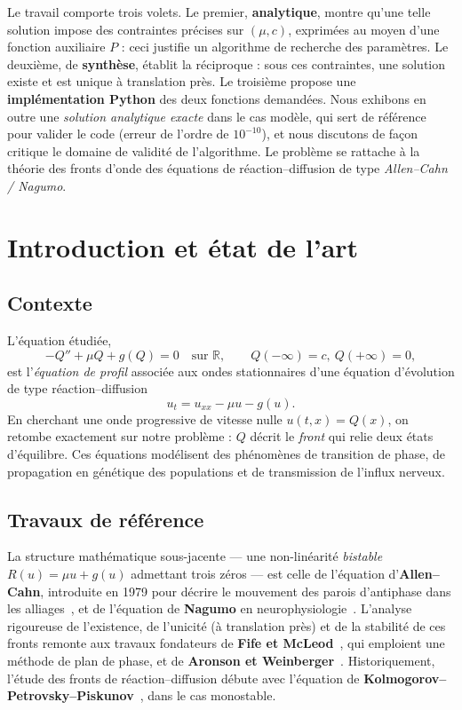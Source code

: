 \documentclass[11pt,a4paper]{article}
\theoremstyle{plain}
\theoremstyle{remark}
\newcommand{\R}{\mathbb{R}}
\begin{document}
Le travail comporte trois volets. Le premier, \textbf{analytique}, montre qu'une
telle solution impose des contraintes précises sur $(\mu,c)$, exprimées au moyen
d'une fonction auxiliaire $P$ : ceci justifie un algorithme de recherche des
paramètres. Le deuxième, de \textbf{synthèse}, établit la réciproque : sous ces
contraintes, une solution existe et est unique à translation près. Le troisième
propose une \textbf{implémentation Python} des deux fonctions demandées. Nous
exhibons en outre une \emph{solution analytique exacte} dans le cas modèle, qui
sert de référence pour valider le code (erreur de l'ordre de $10^{-10}$), et nous
discutons de façon critique le domaine de validité de l'algorithme. Le problème
se rattache à la théorie des fronts d'onde des équations de réaction–diffusion
de type \emph{Allen–Cahn / Nagumo}.

\newpage
\tableofcontents
\newpage

\section{Introduction et état de l'art}

\subsection{Contexte}
L'équation étudiée,
\[
  -Q'' + \mu Q + g(Q) = 0 \quad \text{sur } \R,
  \qquad Q(-\infty)=c,\ Q(+\infty)=0,
\]
est l'\emph{équation de profil} associée aux ondes stationnaires d'une équation
d'évolution de type réaction–diffusion
\[
  u_t = u_{xx} - \mu u - g(u).
\]
En cherchant une onde progressive de vitesse nulle $u(t,x)=Q(x)$, on retombe
exactement sur notre problème : $Q$ décrit le \emph{front} qui relie deux états
d'équilibre. Ces équations modélisent des phénomènes de transition de phase, de
propagation en génétique des populations et de transmission de l'influx nerveux.

\subsection{Travaux de référence}
La structure mathématique sous-jacente — une non-linéarité \emph{bistable}
$R(u)=\mu u+g(u)$ admettant trois zéros — est celle de l'équation
d'\textbf{Allen–Cahn}, introduite en 1979 pour décrire le mouvement des parois
d'antiphase dans les alliages~\cite{allencahn1979}, et de l'équation de
\textbf{Nagumo} en neurophysiologie~\cite{nagumo1962}. L'analyse rigoureuse de
l'existence, de l'unicité (à translation près) et de la stabilité de ces fronts
remonte aux travaux fondateurs de \textbf{Fife et McLeod}~\cite{fifemcleod1977},
qui emploient une méthode de plan de phase, et de \textbf{Aronson et
Weinberger}~\cite{aronsonweinberger1978}. Historiquement, l'étude des fronts de
réaction–diffusion débute avec l'équation de
\textbf{Kolmogorov–Petrovsky–Piskunov}~\cite{kpp1937}, dans le cas monostable.
\end{document}

